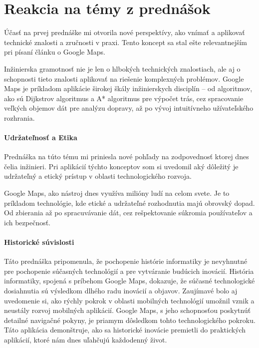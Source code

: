 \documentclass[10pt,slovak,a4paper]{article}
\begin{document}
\section{Reakcia na témy z prednášok}
Účasť na prvej prednáške mi otvorila nové perspektívy, ako vnímať a aplikovať technické znalosti a zručnosti v praxi. Tento koncept sa stal ešte relevantnejším pri písaní článku o Google Maps.
\par
Inžinierska gramotnosť nie je len o hlbokých technických znalostiach, ale aj o schopnosti tieto znalosti aplikovať na riešenie komplexných problémov. Google Maps je príkladom aplikácie širokej škály inžinierskych disciplín – od algoritmov, ako sú Dijkstrov algoritmus a A* algoritmus pre výpočet trás, cez spracovanie veľkých objemov dát pre analýzu dopravy, až po vývoj intuitívneho užívateľského rozhrania.
\paragraph{Udržateľnosť a Etika}
Prednáška na túto tému mi priniesla nové pohľady na zodpovednosť ktorej dnes čelia inžinieri. Pri aplikácií týchto konceptov som si uvedomil aký dôležitý je udržateľný a etický prístup v oblasti technologického rozvoja. \par
Google Maps, ako nástroj dnes využíva milióny ludí na celom svete. Je to príkladom technológie, kde etické a udržateľné rozhodnutia majú obrovský dopad. Od zbierania až po spracuvávanie dát, cez rešpektovanie súkromia používateľov a ich bezpečnosť.
\paragraph{Historické súvislosti} 
Táto prednáška pripomenula, že pochopenie histórie informatiky je nevyhnutné pre pochopenie súčasných technológií a pre vytváranie budúcich inovácií. História informatiky, spojená s príbehom Google Maps, dokazuje, že súčasné technologické dosiahnutia sú výsledkom dlhého radu inovácií a objavov.
Zaujímavé bolo aj uvedomenie si, ako rýchly pokrok v oblasti mobilných technológií umožnil vznik a neustály rozvoj mobilných aplikácií. Google Maps, s jeho schopnosťou poskytnúť detailné navigačné pokyny, je priamym dôsledkom tohto technologického pokroku. Táto aplikácia demonštruje, ako sa historické inovácie premietli do praktických aplikácií, ktoré nám dnes uľahčujú každodenný život.






\end{document}
